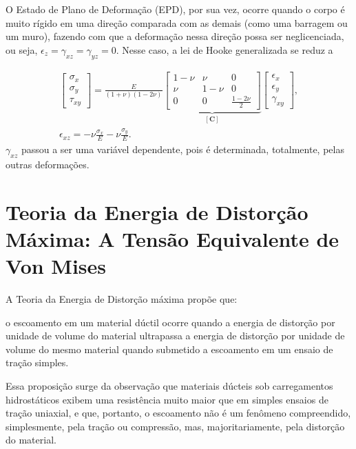 O Estado de Plano de Deformação (EPD), por sua vez, ocorre quando o corpo é muito rígido em uma direção comparada com as demais (como uma barragem ou um muro), fazendo com que a deformação nessa direção possa ser neglicenciada, ou seja, $\epsilon_z = \gamma_{xz} = \gamma_{yz} = 0$. Nesse caso, a lei de Hooke generalizada se reduz a

\begin{gather}
    \begin{bmatrix}
        \sigma_x \\
        \sigma_y \\
        \tau_{xy}
    \end{bmatrix} = \frac{E}{(1+\nu)(1-2\nu)} 
    \underbrace{\begin{bmatrix}
        1 - \nu & \nu & 0 \\
        \nu & 1 - \nu & 0 \\
        0 & 0 & \frac{1-2\nu}{2}
    \end{bmatrix}}_{[\bm{C}]}
    \begin{bmatrix}
        \epsilon_x \\
        \epsilon_y \\
        \gamma_{xy}
    \end{bmatrix}, \\
    \epsilon_{xz} = -\nu \frac{\sigma_x}{E} - \nu \frac{\sigma_y}{E}.
\end{gather}
$\gamma_{xz}$ passou a ser uma variável dependente, pois é determinada, totalmente, pelas outras deformações.  \cite[pág. 91]{Zin}



\section{Teoria da Energia de Distorção Máxima: A Tensão Equivalente de Von Mises}

A Teoria da Energia de Distorção máxima propõe que:
\begin{citacao}
    o escoamento em um material dúctil ocorre quando a energia de distorção por unidade de volume do material ultrapassa a energia de distorção por unidade de volume do mesmo material quando submetido a escoamento em um ensaio de tração simples. \cite{Hibbeler}
\end{citacao}

Essa proposição surge da observação que materiais dúcteis sob carregamentos hidrostáticos exibem uma resistência muito maior que em simples ensaios de tração uniaxial, e que, portanto, o escoamento não é um fenômeno compreendido, simplesmente, pela tração ou compressão, mas, majoritariamente, pela distorção do material. \cite{Hibbeler}

